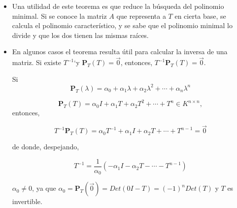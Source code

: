 \begin{remark}
\begin{itemize}
\item
Una utilidad de este teorema es que reduce la búsqueda del polinomio minimal. Si se conoce la matriz $A$ que representa a $T$ en cierta base, se  calcula el polinomio característico, y se sabe que el polinomio minimal lo divide y que los dos tienen las mismas raíces.

\bigskip

\item

En algunos casos el teorema resulta útil para calcular la inversa de una matriz. Si existe $T^{-1}$`y $\mathbf{P}_T(T) =\vec{0}$, entonces,   $T^{-1 }\mathbf{P}_T(T) =\vec{0}$.


Si
 $$\mathbf{P}_T(\lambda)=\alpha_0+\alpha_1\lambda+\alpha_2\lambda^2+\cdots+\alpha_{n}\lambda^{n}$$



$$\mathbf{P}_T(T)=\alpha_0I+\alpha_1T+\alpha_2T^2+\cdots+T^{n} \in K^{n \times n} , $$
\noindent
entonces,

$$T^{-1 }\mathbf{P}_T(T)=  \alpha_0 T^{-1 }  +\alpha_1I+\alpha_2T+\cdots+T^{n-1}=\vec{0}$$

\noindent
de donde, despejando,

$$T^{-1 }= \frac{1} {\alpha_0}(  - \alpha_1I-\alpha_2T-\cdots-T^{n-1})$$

\bigskip
$\alpha_0 \neq 0$, ya que $\alpha_0= \mathbf{P}_T(\Vec{0})=Det(0I-T)=(-1)^n Det(T)$ y $T$ es invertible.
\end{itemize}
\end{remark}


